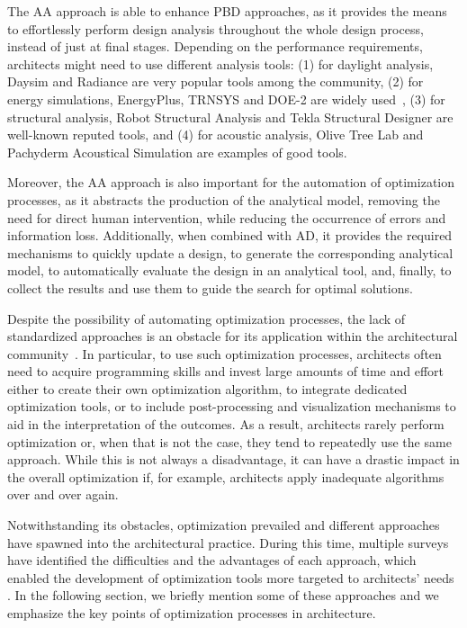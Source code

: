 The \ac{AA} approach is able to enhance \ac{PBD} approaches, as it provides the means to effortlessly perform design analysis throughout the whole design process, instead of just at final stages. Depending on the performance requirements, architects might need to use different analysis tools: (1) for daylight analysis, Daysim and Radiance are very popular tools among the community, (2) for energy simulations, EnergyPlus, TRNSYS and DOE-2 are widely used~\cite{Nguyen2014}, (3) for structural analysis, Robot Structural Analysis and Tekla Structural Designer are well-known reputed tools, and (4) for acoustic analysis, Olive Tree Lab and Pachyderm Acoustical Simulation are examples of good tools.%

Moreover, the \ac{AA} approach is also important for the automation of optimization processes, as it abstracts the production of the analytical model, removing the need for direct human intervention, while reducing the occurrence of errors and information loss. Additionally, when combined with \ac{AD}, it provides the required mechanisms to quickly update a design, to generate the corresponding analytical model, to automatically evaluate the design in an analytical tool, and, finally, to collect the results and use them to guide the search for optimal solutions. 

Despite the possibility of automating optimization processes, the lack of standardized approaches is an obstacle for its application within the architectural community~\cite{Attia2013}. In particular, to use such optimization processes, architects often need to acquire programming skills and invest large amounts of time and effort either to create their own optimization algorithm, to integrate dedicated optimization tools, or to include post-processing and visualization mechanisms to aid in the interpretation of the outcomes. As a result, architects rarely perform optimization or, when that is not the case, they tend to repeatedly use the same approach. While this is not always a disadvantage, it can have a drastic impact in the overall optimization if, for example, architects apply inadequate algorithms over and over again.

Notwithstanding its obstacles, optimization prevailed and different approaches have spawned into the architectural practice. During this time, multiple surveys have identified the difficulties and the advantages of each approach, which enabled the development of optimization tools more targeted to architects' needs \cite{Attia2013,Nguyen2014,Shi2016}. In the following section, we briefly mention some of these approaches and we emphasize the key points of optimization processes in architecture.
	
